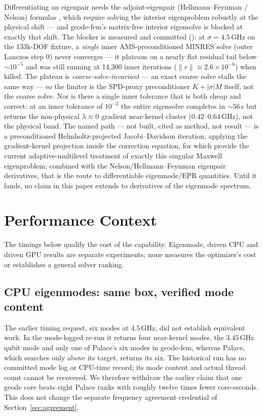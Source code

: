 \documentclass{anvil-paper}
\begin{document}
Differentiating an eigenpair needs the adjoint-eigenpair
(Hellmann--Feynman / Nelson) formulas
\citep{nelson1976simplified}, which require solving the interior
eigenproblem robustly at the physical shift --- and geode-fem's
matrix-free interior eigensolve is blocked at exactly that shift. The
blocker is measured and committed
():
at $\sigma = 4.5$\,GHz on the 133k-DOF fixture, a \emph{single} inner
AMS-preconditioned MINRES solve (outer Lanczos step 0) never converges
--- it plateaus on a nearly flat residual tail below ${\sim}10^{-5}$ and
was still running at 14{,}300 inner iterations ($\lVert r\rVert \approx
2.6\times10^{-6}$) when killed. The plateau is
\emph{coarse-solve-invariant} --- an exact coarse solve stalls the same
way --- so the limiter is the SPD-proxy preconditioner $K + |\sigma|M$
itself, not the coarse solve. Nor is there a single inner tolerance that
is both cheap and correct: at an inner tolerance of $10^{-2}$ the entire
eigensolve completes in ${\sim}56$\,s but returns the non-physical
$\lambda \approx 0$ gradient near-kernel cluster ($0.42$--$0.64$\,GHz),
not the physical band. The named path --- not built, cited as method,
not result --- is a preconditioned Helmholtz-projected Jacobi--Davidson
iteration, applying the gradient-kernel projection inside the correction
equation, for which \citet{liang2026adaptive} provide the current
adaptive-multilevel treatment of exactly this singular Maxwell
eigenproblem; combined with the Nelson/Hellmann--Feynman eigenpair
derivatives, that is the route to differentiable eigenmode/EPR
quantities. Until it lands, no claim in this paper extends to
derivatives of the eigenmode spectrum.

\section{Performance Context}
\label{sec:perf}

The timings below qualify the cost of the capability. Eigenmode,
driven CPU and driven GPU results are separate experiments; none measures
the optimizer's cost or establishes a general solver ranking.

\subsection{CPU eigenmodes: same box, verified mode content}
\label{sec:perf-cpu}

The earlier timing request, six modes at $4.5$\,GHz, did not establish
equivalent work. In the mode-logged re-run it returns four near-kernel
modes, the $3.45$\,GHz qubit mode and only one of Palace's six modes in
geode-fem, whereas Palace, which searches only above its target, returns
its six. The historical run has
no committed mode log or CPU-time record; its mode content and actual
thread count cannot be recovered. We therefore withdraw the earlier
claim that one geode core beats eight Palace ranks with roughly twelve
times fewer core-seconds. This does not change the separate frequency
agreement credential of Section~\ref{sec:agreement}.
\end{document}
